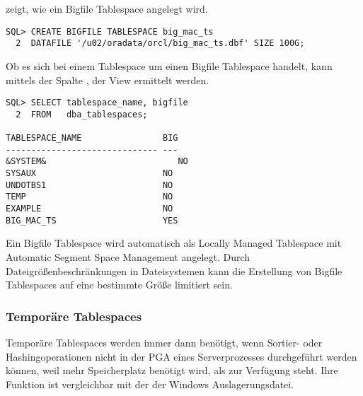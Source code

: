            zeigt, wie ein Bigfile Tablespace angelegt wird.
          \begin{lstlisting}[caption={Einen Bigfile Tablespace anlegen},label=admin107,language=oracle_sql]
SQL> CREATE BIGFILE TABLESPACE big_mac_ts
  2  DATAFILE '/u02/oradata/orcl/big_mac_ts.dbf' SIZE 100G;
          \end{lstlisting}
          Ob es sich bei einem Tablespace um einen Bigfile Tablespace handelt, kann mittels der Spalte , der View  ermittelt werden.
          \begin{lstlisting}[caption={Die View \identifier{dba\_tablespaces}},label=admin108,language=oracle_sql]
SQL> SELECT tablespace_name, bigfile
  2  FROM   dba_tablespaces;

TABLESPACE_NAME                BIG
------------------------------ ---
&SYSTEM&                          NO
SYSAUX                         NO
UNDOTBS1                       NO
TEMP                           NO
EXAMPLE                        NO
BIG_MAC_TS                     YES
          \end{lstlisting}
          \begin{merke}
            Ein Bigfile Tablespace wird automatisch als Locally Managed Tablespace mit Automatic Segment Space Management angelegt. Durch Dateigr\"o\ss{}enbeschr\"ankungen in Dateisystemen kann die Erstellung von Bigfile Tablespaces auf eine bestimmte Gr\"o\ss{}e limitiert sein.
          \end{merke}
        \subsubsection{Tempor\"are Tablespaces}
          Tempor\"are Tablespaces werden immer dann ben\"otigt, wenn Sortier- oder Hashingoperationen nicht in der PGA eines Serverprozesses durchgef\"uhrt werden k\"onnen, weil mehr Speicherplatz ben\"otigt wird, als zur Verf\"ugung steht. Ihre Funktion ist vergleichbar mit der der Windows Auslagerungsdatei.

